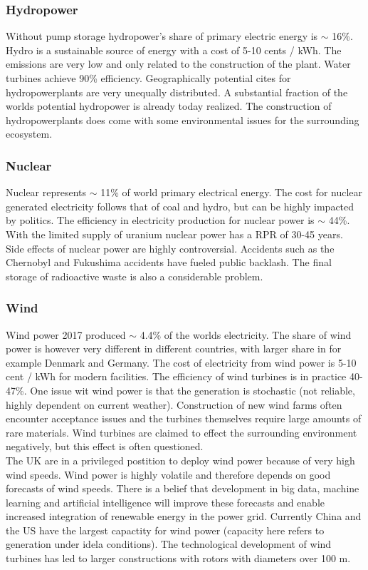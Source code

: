 \subsubsection{Hydropower}
Without pump storage hydropower's share of primary electric energy is $\sim$ 16\%.
Hydro is a sustainable source of energy with a cost of 5-10 cents / kWh.
The emissions are very low and only related to the construction of the plant.
Water turbines achieve 90\% efficiency.
Geographically potential cites for hydropowerplants are very unequally distributed.
A substantial fraction of the worlds potential hydropower is already today realized.
The construction of hydropowerplants does come with some environmental issues for the surrounding ecosystem.

\subsubsection{Nuclear}
Nuclear represents $\sim$ 11\% of world primary electrical energy. The cost for nuclear generated electricity follows that of coal and hydro, but can be highly impacted by politics.
The efficiency in electricity production for nuclear power is $\sim$ 44\%.
With the limited supply of uranium nuclear power has a RPR of 30-45 years.
Side effects of nuclear power are highly controversial. Accidents such as the Chernobyl and Fukushima accidents have fueled public backlash. The final storage of radioactive waste is also a considerable problem.

\subsubsection{Wind}
Wind power 2017 produced $\sim$ 4.4\% of the worlds electricity.
The share of wind power is however very different in different countries, with larger share in for example Denmark and Germany.
The cost of electricity from wind power is 5-10 cent / kWh for modern facilities.
The efficiency of wind turbines is in practice 40-47\%.
One issue wit wind power is that the generation is stochastic (not reliable, highly dependent on current weather).
Construction of new wind farms often encounter acceptance issues and the turbines themselves require large amounts of rare materials.
Wind turbines are claimed to effect the surrounding environment negatively, but this effect is often questioned.\\

The UK are in a privileged postition to deploy wind power because of very high wind speeds.
Wind power is highly volatile and therefore depends on good forecasts of wind speeds.
There is a belief that development in big data, machine learning and artificial intelligence will improve these forecasts and enable increased integration of renewable energy in the power grid.
Currently China and the US have the largest capactity for wind power (capacity here refers to generation under idela conditions).
The technological development of wind turbines has led to larger constructions with rotors with diameters over 100 m.

